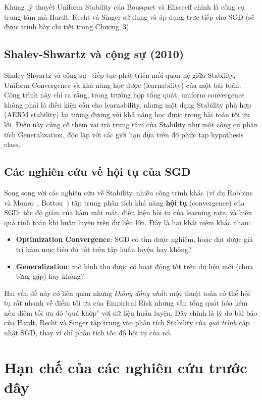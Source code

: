 Khung lý thuyết Uniform Stability của Bousquet và Elisseeff chính là công cụ trung tâm mà Hardt, Recht và Singer sử dụng và áp dụng trực tiếp cho SGD (sẽ được trình bày chi tiết trong Chương~3).

\subsection{Shalev-Shwartz và cộng sự (2010)}

Shalev-Shwartz và cộng sự~\cite{shalev2010learnability} tiếp tục phát triển mối quan hệ giữa Stability, Uniform Convergence và khả năng học được (learnability) của một bài toán. Công trình này chỉ ra rằng, trong trường hợp tổng quát, uniform convergence không phải là điều kiện cần cho learnability, nhưng một dạng Stability phù hợp (AERM stability) lại tương đương với khả năng học được trong bài toán tối ưu lồi. Điều này củng cố thêm vai trò trung tâm của Stability như một công cụ phân tích Generalization, độc lập với các giới hạn dựa trên độ phức tạp hypothesis class.

\subsection{Các nghiên cứu về hội tụ của SGD}

Song song với các nghiên cứu về Stability, nhiều công trình khác (ví dụ Robbins và Monro~\cite{robbins1951stochastic}, Bottou~\cite{bottou2010large}) tập trung phân tích khả năng \textbf{hội tụ} (convergence) của SGD: tốc độ giảm của hàm mất mát, điều kiện hội tụ của learning rate, và hiệu quả tính toán khi huấn luyện trên dữ liệu lớn. Đây là hai khái niệm khác nhau:
\begin{itemize}
    \item \textbf{Optimization Convergence}: SGD có tìm được nghiệm, hoặc đạt được giá trị hàm mục tiêu đủ tốt trên tập huấn luyện hay không?
    \item \textbf{Generalization}: mô hình thu được có hoạt động tốt trên dữ liệu mới (chưa từng gặp) hay không?
\end{itemize}
Hai vấn đề này có liên quan nhưng \emph{không đồng nhất}: một thuật toán có thể hội tụ rất nhanh về điểm tối ưu của Empirical Risk nhưng vẫn tổng quát hóa kém nếu điểm tối ưu đó "quá khớp" với dữ liệu huấn luyện. Đây chính là lý do bài báo của Hardt, Recht và Singer tập trung vào phân tích Stability của \emph{quá trình} cập nhật SGD, thay vì chỉ phân tích tốc độ hội tụ của nó.

\section{Hạn chế của các nghiên cứu trước đây}
\label{sec:hanche}

